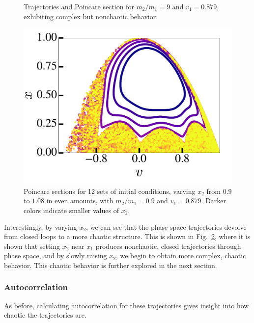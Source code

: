\documentclass[pra,twocolumn,showpacs,amsmath,amssymb, aps, 10pt]{revtex4-1}
\begin{document}
\begin{figure}
  \caption{Trajectories and Poincare section for $m_2/m_1 = 9$ and $v_1 = 0.879$, exhibiting
  complex but nonchaotic behavior.}
  \label{fig:9-nonchaotic}
\end{figure}

\begin{figure}[h]
  \includegraphics[width=0.8\linewidth]{multiple_r0_1_poincare}
  \caption{Poincare sections for 12 sets of initial conditions, varying $x_2$
  from $0.9$ to $1.08$ in even amounts, with $m_2/m_1 = 0.9$ and $v_1 = 0.879$.
  Darker colors indicate smaller values of $x_2$.}
  \label{fig:multiple}
\end{figure}

Interestingly, by varying $x_2$, we can see that the phase space
trajectories devolve from closed loops to a more chaotic structure. This is shown
in Fig.~\ref{fig:multiple}, where it is shown that setting $x_2$ near $x_1$
produces nonchaotic, closed trajectories through phase space, and by slowly raising
$x_2$, we begin to obtain more complex, chaotic behavior. This chaotic behavior
is further explored in the next section.


\subsubsection{Autocorrelation}\label{sec:9-acorr}

As before, calculating autocorrelation for these trajectories gives insight into
how chaotic the trajectories are.
\end{document}
